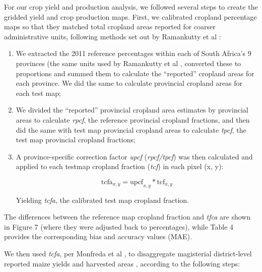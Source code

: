 \documentclass[11pt, titlepage]{article}
\begin{document}
For our crop yield and production analysis, we followed several steps to create the gridded yield and crop production maps. First, we calibrated cropland percentage maps so that they matched total cropland areas reported for coarser administrative units, following methods set out by Ramankutty et al \cite{ramankutty_farming_2008}: 

\begin{enumerate}
 \item We extracted the 2011 reference percentages within each of South Africa's 9 provinces (the same units used by Ramankutty et al \cite{ramankutty_farming_2008}, converted these to proportions and summed them to calculate the ``reported'' cropland areas for each province. We did the same to calculate provincial cropland areas for each test map;  
  \item We divided the ``reported'' provincial cropland area estimates by provincial areas to calculate \emph{rpcf}, the reference provincial cropland fractions, and then did the same with test map provincial cropland areas to calculate \emph{tpcf}, the test map provincial cropland fractions; 
  \item A province-specific correction factor \emph{upcf} (\emph{rpcf/tpcf}) was then calculated and applied to each testmap cropland fraction (\emph{tcf}) in each pixel (x, y):

  \begin{equation}  
    \textrm{tcfa}_{x,y} = \textrm{upcf}_{x,y} * \textrm{tcf}_{x,y}
  \end{equation}

Yielding \emph{tcfa}, the calibrated test map cropland fraction.  
\end{enumerate}

The differences between the reference map cropland fraction and \emph{tfca} are shown in Figure 7 (where they were adjusted back to percentages), while Table 4 provides the corresponding bias and accuracy values (MAE).

We then used \emph{tcfa}, per Monfreda et al \cite{monfreda_farming_2008}, to disaggregate magisterial district-level reported maize yields and harvested areas \cite{statistics_south_africa_building_2007}, according to the following steps: 
\end{document}
